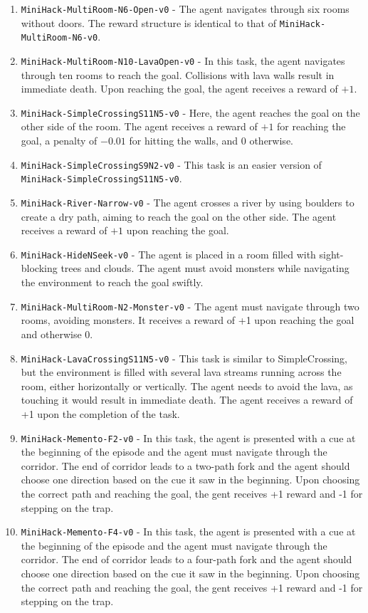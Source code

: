 \begin{enumerate}
    \item \texttt{MiniHack-MultiRoom-N6-Open-v0} - The agent navigates through six rooms without doors. The reward structure is identical to that of \texttt{MiniHack-MultiRoom-N6-v0}.
    \item \texttt{MiniHack-MultiRoom-N10-LavaOpen-v0} - In this task, the agent navigates through ten rooms to reach the goal. Collisions with lava walls result in immediate death. Upon reaching the goal, the agent receives a reward of $+1$.
    \item \texttt{MiniHack-SimpleCrossingS11N5-v0} -  Here, the agent reaches the goal on the other side of the room. The agent receives a reward of $+1$ for reaching the goal, a penalty of $-0.01$ for hitting the walls, and $0$ otherwise.
    \item \texttt{MiniHack-SimpleCrossingS9N2-v0} - This task is an easier version of \texttt{MiniHack-SimpleCrossingS11N5-v0}.
    \item \texttt{MiniHack-River-Narrow-v0} - The agent crosses a river by using boulders to create a dry path, aiming to reach the goal on the other side. The agent receives a reward of $+1$ upon reaching the goal.
    \item \texttt{MiniHack-HideNSeek-v0} - The agent is placed in a room filled with sight-blocking trees and clouds. The agent must avoid monsters while navigating the environment to reach the goal swiftly.
    \item \texttt{MiniHack-MultiRoom-N2-Monster-v0} -  The agent must navigate through two rooms, avoiding monsters. It receives a reward of +1 upon reaching the goal and otherwise 0. 
    \item \texttt{MiniHack-LavaCrossingS11N5-v0} - This task is similar to SimpleCrossing, but the environment is filled with several lava streams running across the room, either horizontally or vertically. The agent needs to avoid the lava, as touching it would result in immediate death.
    The agent receives a reward of +1 upon the completion of the task. 
    \item \texttt{MiniHack-Memento-F2-v0} - In this task, the agent is presented with a cue at the beginning of the episode and the agent must navigate through the corridor. The end of corridor leads to a two-path fork and the agent should choose one direction based on the cue it saw in the beginning. Upon choosing the correct path and reaching the goal, the gent receives +1 reward and -1 for stepping on the trap. 
    \item \texttt{MiniHack-Memento-F4-v0} - In this task, the agent is presented with a cue at the beginning of the episode and the agent must navigate through the corridor. The end of corridor leads to a four-path fork and the agent should choose one direction based on the cue it saw in the beginning. Upon choosing the correct path and reaching the goal, the gent receives +1 reward and -1 for stepping on the trap. 

\end{enumerate}
